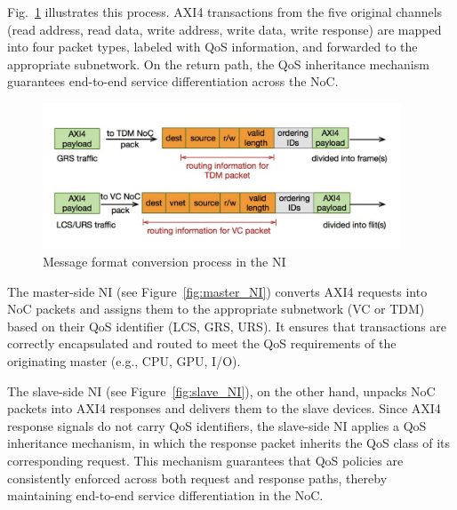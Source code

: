 Fig.~\ref{fig:message_format} illustrates this process. AXI4 transactions from the five original channels (read address, read data, write address, write data, write response) are mapped into four packet types, labeled with QoS information, and forwarded to the appropriate subnetwork. On the return path, the QoS inheritance mechanism guarantees end-to-end service differentiation across the NoC.

\begin{figure}[htbp]
    \centering
    \includegraphics[width=0.95\textwidth]{img/Message format conversion.png}
    \caption{Message format conversion process in the NI}
    \label{fig:message_format}
\end{figure}


The master-side NI (see Figure~\ref{fig:master_NI}) converts AXI4 requests into NoC packets and assigns them to the appropriate subnetwork (VC or TDM) based on their QoS identifier (\ac{LCS}, \ac{GRS}, \ac{URS}). It ensures that transactions are correctly encapsulated and routed to meet the QoS requirements of the originating master (e.g., CPU, GPU, I/O).

The slave-side NI (see Figure~\ref{fig:slave_NI}), on the other hand, unpacks NoC packets into AXI4 responses and delivers them to the slave devices. Since AXI4 response signals do not carry QoS identifiers, the slave-side NI applies a QoS inheritance mechanism, in which the response packet inherits the QoS class of its corresponding request. 
This mechanism guarantees that QoS policies are consistently enforced across both request and response paths, thereby maintaining end-to-end service differentiation in the NoC.

